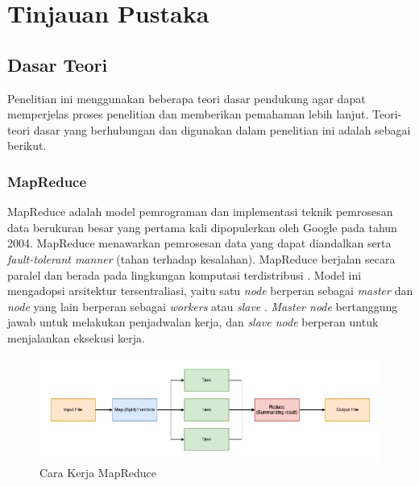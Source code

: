 \chapter{Tinjauan Pustaka}


\section{Dasar Teori}
Penelitian ini menggunakan beberapa teori dasar pendukung agar dapat memperjelas proses penelitian dan memberikan pemahaman lebih lanjut. Teori-teori dasar yang berhubungan dan digunakan dalam penelitian ini adalah sebagai berikut.
\subsection{MapReduce}
MapReduce adalah model pemrograman dan implementasi teknik pemrosesan data berukuran besar yang pertama kali dipopulerkan oleh Google pada tahun 2004\cite{kaliaAnalysisHadoopMapReduce2021}. MapReduce menawarkan pemrosesan data yang dapat diandalkan serta \textit{fault-tolerant manner} (tahan terhadap kesalahan).  MapReduce berjalan secara paralel dan berada pada lingkungan komputasi terdistribusi \cite{cTaskFailureResilience2020}. Model ini mengadopsi arsitektur tersentraliasi, yaitu satu \textit{node} berperan sebagai \textit{master} dan \textit{node} yang lain berperan sebagai \textit{workers} atau \textit{slave} \cite{herodotouHadoopPerformanceModels2011, bakratsasHadoopMapReducePerformance2018}. \textit{Master node} bertanggung jawab untuk melakukan penjadwalan kerja, dan \textit{slave node} berperan untuk menjalankan eksekusi kerja. 

\begin{figure}[h!]
    \centering
    \includegraphics[width=1\textwidth]{figures/ch02/mapreduce-scheme.png}
    \caption{Cara Kerja MapReduce}
    \label{fig:mapreduce-flow}
\end{figure}

